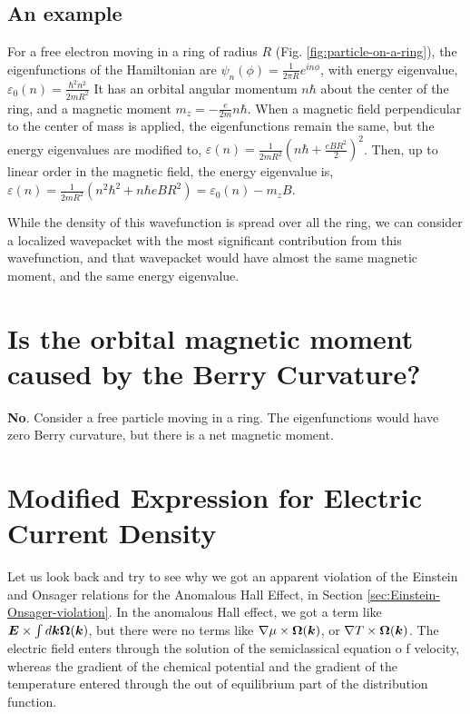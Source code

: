 \documentclass{report}
\renewcommand\vec[1]{\ensuremath\boldsymbol{#1}} %
\begin{document}
\subsection{An example}

For a free electron moving in a ring of radius $R$ (Fig. \ref{fig:particle-on-a-ring}), the eigenfunctions of the Hamiltonian are $\psi_n(\phi) = \frac{1}{2 \pi R} e^{i n \phi}$, with energy eigenvalue, $\varepsilon_{0}(n) = \frac{\hbar^2 n^2}{2 m R^2}$ It has an orbital angular momentum $n\hbar$ about the center of the ring, and a magnetic moment $m_z = -\frac{e}{2m} n\hbar$.
When a magnetic field perpendicular to the center of mass is applied, the eigenfunctions remain the same, but the energy eigenvalues are modified to,
$\varepsilon(n) = \frac{1}{2 m R^2} (n\hbar + \frac{eBR^2}{2})^2$. Then, up to linear order in the magnetic field, the energy eigenvalue is, $\varepsilon(n) = \frac{1}{2 m R^2} (n^2\hbar^2 + n \hbar eBR^2) = \varepsilon_{0}(n) - m_z B$.


While the density of this wavefunction is spread over all the ring, we can consider a localized wavepacket with the most significant contribution from this wavefunction, and that wavepacket would have almost the same magnetic moment, and the same energy eigenvalue.

\section{Is the orbital magnetic moment caused by the Berry Curvature?}
\textbf{No}. Consider a free particle moving in a ring. The eigenfunctions would have zero Berry curvature, but there is a net magnetic moment.
\section{Modified Expression for Electric Current Density}
Let us look back and try to see why we got an apparent violation of the Einstein and Onsager relations for the Anomalous Hall Effect, in Section \ref{sec:Einstein-Onsager-violation}. In the anomalous Hall effect, we got a term like $\vec{E} \times \int d\vec{k} \vec{\Omega}(\vec{k}) $, but there were no terms like $\nabla \mu \times \vec{\Omega}(\vec{k}) $, or $\nabla T \times \vec{\Omega}(\vec{k}) $. The electric field enters through the solution of the semiclassical equation o f velocity, whereas the gradient of the chemical potential and the gradient of the temperature entered through the out of equilibrium part of the distribution function.
\end{document}
